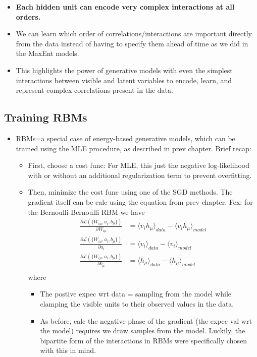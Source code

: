 \documentclass[norsk,a4paper,11pt]{article}
\begin{document}
\begin{itemize}
	\begin{itemize}
		\item \textbf{Each hidden unit can encode very complex interactions at all orders.}
		\item We can learn which order of correlations/interactions are important directly from the data instead of having to specify them ahead of time as we did in the MaxEnt models.
		\item This highlights the power of generative models with even the simplest interactions between visible and latent variables to encode, learn, and represent complex correlations present in the data.
	\end{itemize}
\end{itemize}

\subsection{Training RBMs}
\begin{itemize}
	\item RBMs=a special case of energy-based generative models, which can be trained using the MLE procedure, as described in prev chapter. Brief recap:
	\begin{itemize}
		\item First, choose a cost func: For MLE, this just the negative log-likelihood with or without an additional regularization term to prevent overfitting. 
		\item Then, minimize the cost func using one of the SGD methods. The gradient itself can be calc using the equation from prev chapter. Fex: for the Bernoulli-Bernoulli RBM we have
		\begin{align}
			\frac{\partial \mathcal{L}(\{ W_{i\mu}, a_i, b_\mu \})}{\partial W_{i\mu}} & = \langle v_i h_\mu \rangle_{data} - \langle v_i h_\mu \rangle_{model} \\
			\frac{\partial \mathcal{L}(\{ W_{i\mu}, a_i, b_\mu \})}{\partial a_i} & = \langle  v_i \rangle_{data} - \langle v_i \rangle_{model} \\
			\frac{\partial \mathcal{L}(\{ W_{i\mu}, a_i, b_\mu \})}{\partial b_\mu} & = \langle h_\mu \rangle_{data} - \langle h_\mu \rangle_{model} \\
		\end{align}
		where 
		\begin{itemize}
			\item The postive expec wrt data = sampling from the model while clamping the visible units to their observed values in the data.
			\item As before, calc the negative phase of the gradient (the expec val wrt the model) requires we draw samples from the model. Luckily, the bipartite form of the interactions in RBMs were specifically chosen with this in mind.
		\end{itemize}
	\end{itemize}
\end{itemize}
\end{document}
